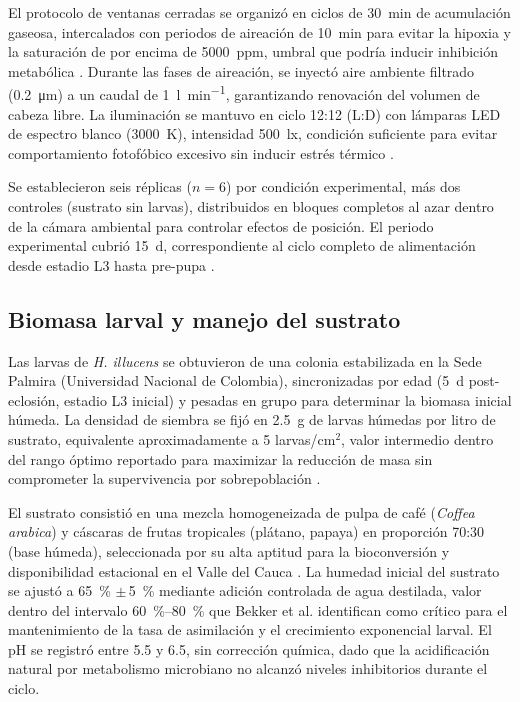 El protocolo de ventanas cerradas se organizó en ciclos de \SI{30}{\minute} de acumulación gaseosa, intercalados con periodos de aireación de \SI{10}{\minute} para evitar la hipoxia y la saturación de  por encima de \SI{5000}{ppm}, umbral que podría inducir inhibición metabólica \parencite{rossiEstimatingDynamicsGreenhouse2024a}. Durante las fases de aireación, se inyectó aire ambiente filtrado (\SI{0.2}{\micro\metre}) a un caudal de \SI{1}{\litre\per\minute}, garantizando renovación del volumen de cabeza libre. La iluminación se mantuvo en ciclo 12:12 (L:D) con lámparas LED de espectro blanco (\SI{3000}{\kelvin}), intensidad \SI{500}{\lux}, condición suficiente para evitar comportamiento fotofóbico excesivo sin inducir estrés térmico \parencite{nayakHermetiaIllucensDiptera2023}.

Se establecieron seis réplicas ($n = 6$) por condición experimental, más dos controles (sustrato sin larvas), distribuidos en bloques completos al azar dentro de la cámara ambiental para controlar efectos de posición. El periodo experimental cubrió \SI{15}{\day}, correspondiente al ciclo completo de alimentación desde estadio L3 hasta pre-pupa \parencite{dienerConversionOrganicMaterial2011}.

\subsection{Biomasa larval y manejo del sustrato}
\label{subsec:cap2_biomassa_sustrato}

Las larvas de \textit{H. illucens} se obtuvieron de una colonia estabilizada en la Sede Palmira (Universidad Nacional de Colombia), sincronizadas por edad (\SI{5}{\day} post-eclosión, estadio L3 inicial) y pesadas en grupo para determinar la biomasa inicial húmeda. La densidad de siembra se fijó en \SI{2.5}{\gram} de larvas húmedas por litro de sustrato, equivalente aproximadamente a \num{5} larvas/cm$^2$, valor intermedio dentro del rango óptimo reportado para maximizar la reducción de masa sin comprometer la supervivencia por sobrepoblación \parencite{dienerConversionOrganicMaterial2011, salamEffectDifferentEnvironmental2022}.

El sustrato consistió en una mezcla homogeneizada de pulpa de café (\textit{Coffea arabica}) y cáscaras de frutas tropicales (plátano, papaya) en proporción 70:30 (base húmeda), seleccionada por su alta aptitud para la bioconversión y disponibilidad estacional en el Valle del Cauca \parencite{brunoValorizationOrganicWaste2025}. La humedad inicial del sustrato se ajustó a \SI{65}{\percent} $\pm$\,\SI{5}{\percent} mediante adición controlada de agua destilada, valor dentro del intervalo \SI{60}{\percent}--\SI{80}{\percent} que Bekker et al. \parencite{bekkerImpactSubstrateMoisture2021a} identifican como crítico para el mantenimiento de la tasa de asimilación y el crecimiento exponencial larval. El pH se registró entre 5.5 y 6.5, sin corrección química, dado que la acidificación natural por metabolismo microbiano no alcanzó niveles inhibitorios durante el ciclo.

